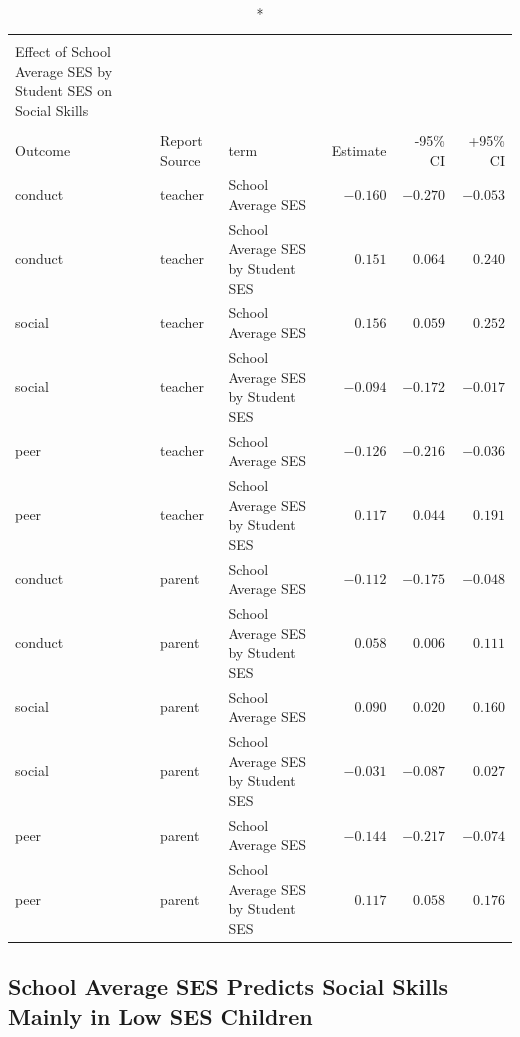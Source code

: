 \documentclass[
  english,
  man]{apa6}
\begin{document}
\captionsetup[table]{labelformat=empty,skip=1pt}
\begin{longtable}{lllrrr}
\caption*{
\large Table 2\\ 
\small Effect of School Average SES by Student SES on Social Skills\\ 
} \\ 
\toprule
Outcome & Report Source & term & Estimate & -95\% CI & +95\% CI \\ 
\midrule
conduct & teacher & School Average SES & $-0.160$ & $-0.270$ & $-0.053$ \\ 
conduct & teacher & School Average SES by Student SES & $0.151$ & $0.064$ & $0.240$ \\ 
social & teacher & School Average SES & $0.156$ & $0.059$ & $0.252$ \\ 
social & teacher & School Average SES by Student SES & $-0.094$ & $-0.172$ & $-0.017$ \\ 
peer & teacher & School Average SES & $-0.126$ & $-0.216$ & $-0.036$ \\ 
peer & teacher & School Average SES by Student SES & $0.117$ & $0.044$ & $0.191$ \\ 
conduct & parent & School Average SES & $-0.112$ & $-0.175$ & $-0.048$ \\ 
conduct & parent & School Average SES by Student SES & $0.058$ & $0.006$ & $0.111$ \\ 
social & parent & School Average SES & $0.090$ & $0.020$ & $0.160$ \\ 
social & parent & School Average SES by Student SES & $-0.031$ & $-0.087$ & $0.027$ \\ 
peer & parent & School Average SES & $-0.144$ & $-0.217$ & $-0.074$ \\ 
peer & parent & School Average SES by Student SES & $0.117$ & $0.058$ & $0.176$ \\ 
\bottomrule
\end{longtable}

\hypertarget{school-average-ses-predicts-social-skills-mainly-in-low-ses-children}{%
\subsection{School Average SES Predicts Social Skills Mainly in Low SES Children}\label{school-average-ses-predicts-social-skills-mainly-in-low-ses-children}}
\end{document}
